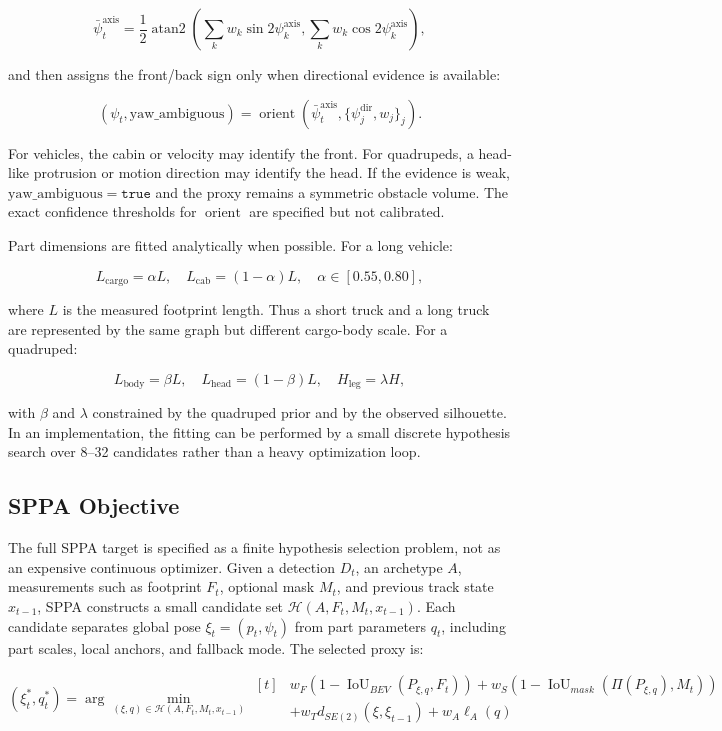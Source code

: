 ﻿\documentclass[11pt,a4paper]{article}
\begin{document}
\[
\bar{\psi}^{\mathrm{axis}}_t =
\frac{1}{2}\operatorname{atan2}\left(
\sum_k w_k \sin 2\psi^{\mathrm{axis}}_k,
\sum_k w_k \cos 2\psi^{\mathrm{axis}}_k
\right),
\]

and then assigns the front/back sign only when directional evidence is
available:

\[
(\psi_t,\mathrm{yaw\_ambiguous}) =
\operatorname{orient}\left(
\bar{\psi}^{\mathrm{axis}}_t,
\{\psi^{\mathrm{dir}}_j,w_j\}_j
\right).
\]

For vehicles, the cabin or velocity may identify the front. For quadrupeds, a
head-like protrusion or motion direction may identify the head. If the evidence
is weak, \(\mathrm{yaw\_ambiguous}=\texttt{true}\) and the proxy remains a
symmetric obstacle volume. The exact confidence thresholds for
\(\operatorname{orient}\) are specified but not calibrated.

Part dimensions are fitted analytically when possible. For a long vehicle:

\[
L_\mathrm{cargo} = \alpha L,\quad
L_\mathrm{cab} = (1-\alpha)L,\quad
\alpha \in [0.55,0.80],
\]

where \(L\) is the measured footprint length. Thus a short truck and a long
truck are represented by the same graph but different cargo-body scale. For a
quadruped:

\[
L_\mathrm{body}=\beta L,\quad
L_\mathrm{head}=(1-\beta)L,\quad
H_\mathrm{leg}=\lambda H,
\]

with \(\beta\) and \(\lambda\) constrained by the quadruped prior and by the
observed silhouette. In an implementation, the fitting can be performed by a
small discrete hypothesis search over 8--32 candidates rather than a heavy
optimization loop.

\subsection{SPPA Objective}

The full SPPA target is specified as a finite hypothesis selection problem, not
as an expensive continuous optimizer. Given a detection \(D_t\), an archetype
\(A\), measurements such as footprint \(F_t\), optional mask \(M_t\), and
previous track state \(x_{t-1}\), SPPA constructs a small candidate set
\(\mathcal{H}(A,F_t,M_t,x_{t-1})\). Each candidate separates global pose
\(\xi_t=(p_t,\psi_t)\) from part parameters \(q_t\), including part scales, local
anchors, and fallback mode. The selected proxy is:

\[
\left(\xi_t^*,q_t^*\right) =
\arg\min_{(\xi,q) \in \mathcal{H}(A,F_t,M_t,x_{t-1})}
\begin{aligned}[t]
&w_F\left(1-\operatorname{IoU}_{BEV}(P_{\xi,q},F_t)\right)
+ w_S\left(1-\operatorname{IoU}_{mask}(\Pi(P_{\xi,q}),M_t)\right)\\
&+ w_T d_{SE(2)}(\xi,\xi_{t-1})
+ w_A \ell_A(q)
\end{aligned}
\]
\end{document}
